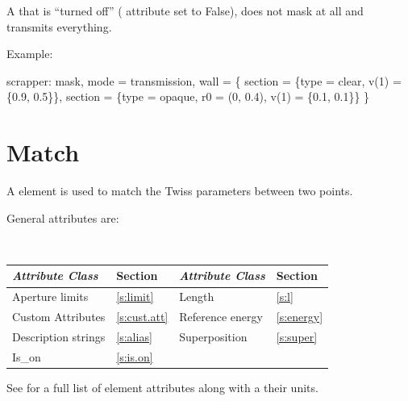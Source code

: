 {A  that is ``turned off'' ( attribute set to False), does not mask at all and
transmits everything.

Example:
\begin{example}
scrapper: mask, mode = transmission, wall = \{
    section = \{type = clear, v(1) = \{0.9, 0.5\}\},
    section = \{type = opaque, r0 = (0, 0.4), v(1) = \{0.1, 0.1\}\}
  \}
\end{example}

\section{Match}
\label{s:match}

A  element is used to match the Twiss parameters between two
points. 

General  attributes are:
\begin{center} 
\tt
\begin{tabular}{llll} \toprule
  {\sl Attribute Class}      & Section           & {\sl Attribute Class}      & Section         \\ \midrule
  Aperture limits            & \ref{s:limit}     & Length                     & \ref{s:l}       \\
  Custom Attributes          & \ref{s:cust.att}  & Reference energy           & \ref{s:energy}  \\ 
  Description strings        & \ref{s:alias}     & Superposition              & \ref{s:super}   \\ 
  Is_on                      & \ref{s:is.on}     &                            &                 \\
  \bottomrule
\end{tabular}
\end{center}
\toffset
See  for a full list of element attributes along with a their units.

}
